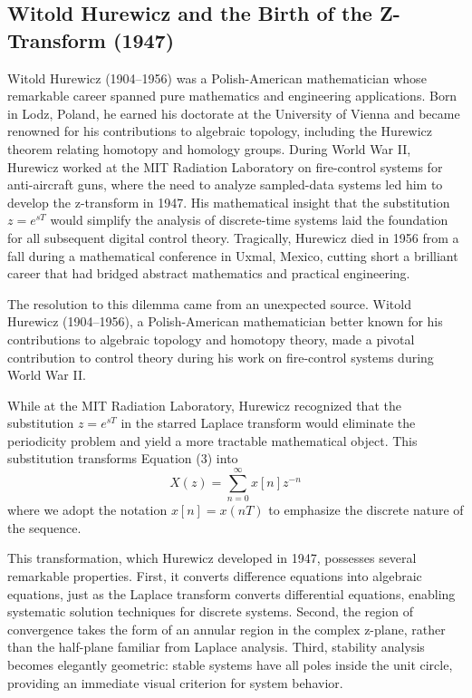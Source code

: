\subsection{Witold Hurewicz and the Birth of the Z-Transform (1947)}

\begin{historicalbox}
Witold Hurewicz (1904--1956) was a Polish-American mathematician whose remarkable career spanned pure mathematics and engineering applications. Born in Lodz, Poland, he earned his doctorate at the University of Vienna and became renowned for his contributions to algebraic topology, including the Hurewicz theorem relating homotopy and homology groups. During World War II, Hurewicz worked at the MIT Radiation Laboratory on fire-control systems for anti-aircraft guns, where the need to analyze sampled-data systems led him to develop the z-transform in 1947. His mathematical insight that the substitution $z = e^{sT}$ would simplify the analysis of discrete-time systems laid the foundation for all subsequent digital control theory. Tragically, Hurewicz died in 1956 from a fall during a mathematical conference in Uxmal, Mexico, cutting short a brilliant career that had bridged abstract mathematics and practical engineering.
\end{historicalbox}

The resolution to this dilemma came from an unexpected source. Witold Hurewicz (1904--1956), a Polish-American mathematician better known for his contributions to algebraic topology and homotopy theory, made a pivotal contribution to control theory during his work on fire-control systems during World War II.

While at the MIT Radiation Laboratory, Hurewicz recognized that the substitution $z = e^{sT}$ in the starred Laplace transform would eliminate the periodicity problem and yield a more tractable mathematical object. This substitution transforms Equation (3) into
\begin{equation}
X(z) = \sum_{n=0}^{\infty} x[n] z^{-n}
\end{equation}
where we adopt the notation $x[n] = x(nT)$ to emphasize the discrete nature of the sequence.

This transformation, which Hurewicz developed in 1947, possesses several remarkable properties. First, it converts difference equations into algebraic equations, just as the Laplace transform converts differential equations, enabling systematic solution techniques for discrete systems. Second, the region of convergence takes the form of an annular region in the complex z-plane, rather than the half-plane familiar from Laplace analysis. Third, stability analysis becomes elegantly geometric: stable systems have all poles inside the unit circle, providing an immediate visual criterion for system behavior.

